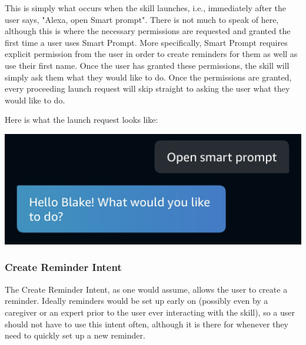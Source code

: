 \documentclass[11pt, oneside]{article}
\begin{document}
This is simply what occurs when the skill launches, i.e., immediately after the user says, "Alexa, open Smart prompt". 
There is not much to speak of here, although this is where the necessary permissions are requested and granted the first time a user uses Smart Prompt. 
More specifically, Smart Prompt requires explicit permission from the user in order to create reminders for them as well as use their first name. 
Once the user has granted these permissions, the skill will simply ask them what they would like to do. 
Once the permissions are granted, every proceeding launch request will skip straight to asking the user what they would like to do. 

Here is what the launch request looks like:
\begin{center}
  \includegraphics[width=\linewidth * 3/4]{images/launchRequest.jpg}
\end{center}

\subsubsection{Create Reminder Intent}

The Create Reminder Intent, as one would assume, allows the user to create a reminder. 
Ideally reminders would be set up early on (possibly even by a caregiver or an expert prior to the user ever interacting with the skill), so a user should not have to use this intent often, although it is there for whenever they need to quickly set up a new reminder. 
\end{document}
